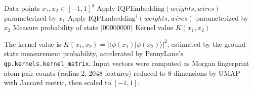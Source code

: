 \documentclass[11pt,a4paper]{article}
\begin{document}
\begin{algorithm}[htbp]
\caption{Quantum kernel circuit for 8-qubit state overlap using PennyLane's \texttt{IQPEmbedding} template.}
\label{SM-alg:qkernel}
\begin{algorithmic}[1]
\REQUIRE Data points $x_1, x_2 \in [-1, 1]^8$
\STATE Apply $\mathrm{IQPEmbedding}(weights, wires)$ parameterized by $x_1$
\STATE Apply $\mathrm{IQPEmbedding}^\dagger(weights, wires)$ parameterized by $x_2$
\STATE Measure probability of state $|00000000\rangle$
\RETURN Kernel value $K(x_1, x_2)$
\end{algorithmic}
\end{algorithm}

The kernel value is $K(x_1, x_2) = |\langle \phi(x_1) | \phi(x_2) \rangle|^2$, estimated by the ground-state measurement probability, accelerated by PennyLane's \texttt{qp.kernels.kernel\_matrix}. Input vectors were computed as Morgan fingerprint atom-pair counts (radius 2, \num{2048} features) reduced to 8 dimensions by UMAP with Jaccard metric, then scaled to $[-1, 1]$.%
\end{document}
